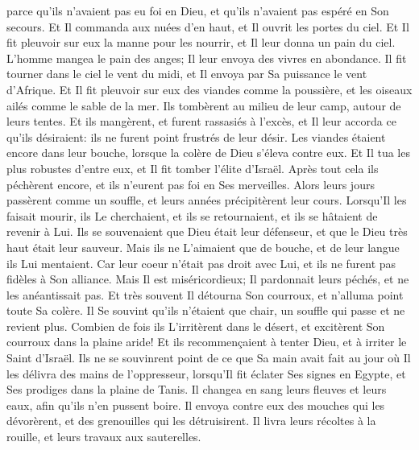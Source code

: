 {\VERSE parce qu'ils n'avaient pas eu foi en Dieu, et qu'ils n'avaient pas espéré en Son secours. \EVERSE
\VERSE Et Il commanda aux nuées d'en haut, et Il ouvrit les portes du ciel. \EVERSE
\VERSE Et Il fit pleuvoir sur eux la manne pour les nourrir, et Il leur donna un pain du ciel. \EVERSE
\VERSE L'homme mangea le pain des anges; Il leur envoya des vivres en abondance. \EVERSE
\VERSE Il fit tourner dans le ciel le vent du midi, et Il envoya par Sa puissance le vent d'Afrique. \EVERSE
\VERSE Et Il fit pleuvoir sur eux des viandes comme la poussière, et les oiseaux ailés comme le sable de la mer. \EVERSE
\VERSE Ils tombèrent au milieu de leur camp, autour de leurs tentes. \EVERSE
\VERSE Et ils mangèrent, et furent rassasiés à l'excès, et Il leur accorda ce qu'ils désiraient:  \EVERSE
\VERSE ils ne furent point frustrés de leur désir. Les viandes étaient encore dans leur bouche,  \EVERSE
\VERSE lorsque la colère de Dieu s'éleva contre eux. Et Il tua les plus robustes d'entre eux, et Il fit tomber l'élite d'Israël. \EVERSE
\VERSE Après tout cela ils péchèrent encore, et ils n'eurent pas foi en Ses merveilles. \EVERSE
\VERSE Alors leurs jours passèrent comme un souffle, et leurs années précipitèrent leur cours. \EVERSE
\VERSE Lorsqu'Il les faisait mourir, ils Le cherchaient, et ils se retournaient, et ils se hâtaient de revenir à Lui. \EVERSE
\VERSE Ils se souvenaient que Dieu était leur défenseur, et que le Dieu très haut était leur sauveur. \EVERSE
\VERSE Mais ils ne L'aimaient que de bouche, et de leur langue ils Lui mentaient. \EVERSE
\VERSE Car leur coeur n'était pas droit avec Lui, et ils ne furent pas fidèles à Son alliance. \EVERSE
\VERSE Mais Il est miséricordieux; Il pardonnait leurs péchés, et ne les anéantissait pas. Et très souvent Il détourna Son courroux, et n'alluma point toute Sa colère. \EVERSE
\VERSE Il Se souvint qu'ils n'étaient que chair, un souffle qui passe et ne revient plus. \EVERSE
\VERSE Combien de fois ils L'irritèrent dans le désert, et excitèrent Son courroux dans la plaine aride! \EVERSE
\VERSE Et ils recommençaient à tenter Dieu, et à irriter le Saint d'Israël. \EVERSE
\VERSE Ils ne se souvinrent point de ce que Sa main avait fait au jour où Il les délivra des mains de l'oppresseur, \EVERSE
\VERSE lorsqu'Il fit éclater Ses signes en Egypte, et Ses prodiges dans la plaine de Tanis. \EVERSE
\VERSE Il changea en sang leurs fleuves et leurs eaux, afin qu'ils n'en pussent boire. \EVERSE
\VERSE Il envoya contre eux des mouches qui les dévorèrent, et des grenouilles qui les détruisirent. \EVERSE
\VERSE Il livra leurs récoltes à la rouille, et leurs travaux aux sauterelles. \EVERSE
}
